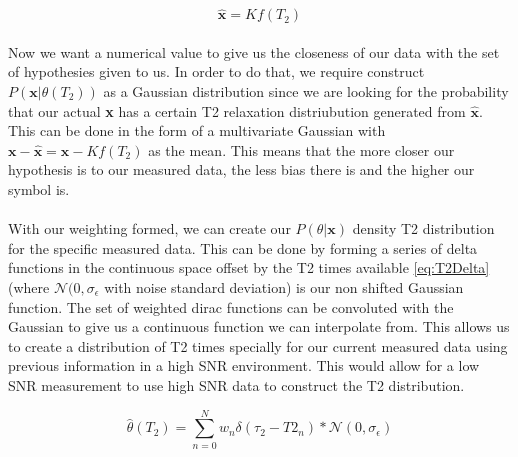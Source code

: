 \documentclass[]{article}
\begin{document}
	\begin{equation}
	\hat{\textbf{x}} = Kf(T_2)
	\label{eq:formEstMeasured}
	\end{equation}
	
\paragraph{}
	Now we want a numerical value to give us the closeness of our data with the set of hypothesies given to us. In order to do that, we require construct $ P(\textbf{x}|\theta(T_2)) $ as a Gaussian distribution since we are looking for the probability that our actual \textbf{x} has a certain T2 relaxation distriubution generated from $ \hat{\textbf{x}} $. This can be done in the form of a multivariate Gaussian with $ \textbf{x} - \hat{\textbf{x}} = \textbf{x} - Kf(T_2) $ as the mean. This means that the more closer our hypothesis is to our measured data, the less bias there is and the higher our symbol is.

\paragraph{}
	With our weighting formed, we can create our $ P(\theta|\textbf{x}) $ density T2 distribution for the specific measured data. This can be done by forming a series of delta functions in the continuous space offset by the T2 times available \ref{eq:T2Delta} (where $ \mathcal{N}(0, \sigma_\epsilon $ with noise standard deviation) is our non shifted Gaussian function. The set of weighted dirac functions can be convoluted with the Gaussian to give us a continuous function we can interpolate from. This allows us to create a distribution of T2 times specially for our current measured data using previous information in a high SNR environment. This would allow for a low SNR measurement to use high SNR data to construct the T2 distribution.
	
	\begin{equation}
		\hat{\theta}(T_2) = \sum_{n = 0}^{N} w_n\delta(\tau_2 - T2_n) * \mathcal{N}(0, \sigma_\epsilon)
		\label{eq:T2Delta}
	\end{equation}
\end{document}
